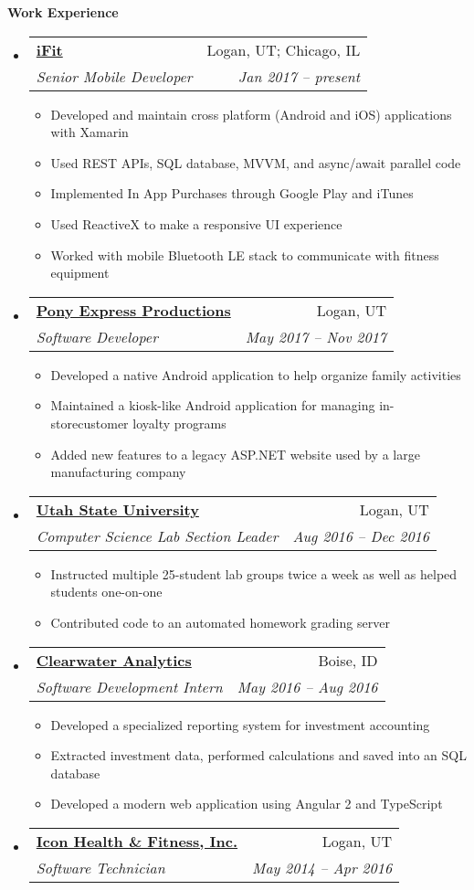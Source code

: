 \documentclass[letterpaper,11pt]{article}
\makeatletter
\newcommand{\resitem}[1]{\item #1 \vspace{-2pt}}
\newcommand{\resheading}[1]{{\large \colorbox{mygrey}{\begin{minipage}{\textwidth}{\textbf{#1 \vphantom{p\^{E}}}}\end{minipage}}}}
\newcommand{\ressubheading}[4]{
\begin{tabular*}{6.5in}{l@{\extracolsep{\fill}}r}
		\textbf{#1} & #2 \\
		\textit{#3} & \textit{#4} \\
\end{tabular*}\vspace{-6pt}}
\makeatother
\begin{document}
\resheading{Work Experience}
	\begin{itemize}
		\item 
		\ressubheading{\href{http://www.ifit.com}{iFit}}{Logan, UT; Chicago, IL}{Senior Mobile Developer}{Jan 2017 -- present}
		{ \footnotesize
			\begin{itemize}
				\resitem{Developed and maintain cross platform (Android and iOS) applications with Xamarin}
				\resitem{Used REST APIs, SQL database, MVVM, and async/await parallel code}
				\resitem{Implemented In App Purchases through Google Play and iTunes}
				\resitem{Used ReactiveX to make a responsive UI experience}
				\resitem{Worked with mobile Bluetooth LE stack to communicate with fitness equipment}
			\end{itemize}
		}
		\item 
		\ressubheading{\href{http://www.pxp200.com}{Pony Express Productions}}{Logan, UT}{Software Developer}{May 2017 -- Nov 2017}
		{ \footnotesize
			\begin{itemize}
				\resitem{Developed a native Android application to help organize family activities}
				\resitem{Maintained a kiosk-like Android application for managing in-storecustomer loyalty programs}
				\resitem{Added new features to a legacy ASP.NET website used by a large manufacturing company}
			\end{itemize}
		}
		\item 
		\ressubheading{\href{http://www.cs.usu.edu}{Utah State University}}{Logan, UT}{Computer Science Lab Section Leader}{Aug 2016 -- Dec 2016}
		{ \footnotesize
			\begin{itemize}
				\resitem{Instructed multiple 25-student lab groups twice a week as well as helped students one-on-one}
				\resitem{Contributed code to an automated homework grading server}
			\end{itemize}
		}
		\item 
		\ressubheading{\href{http://www.clearwateranalytics.com}{Clearwater Analytics}}{Boise, ID}{Software Development Intern}{May 2016 -- Aug 2016}
		{ \footnotesize
			\begin{itemize}
				\resitem{Developed a specialized reporting system for investment accounting}
				\resitem{Extracted investment data, performed calculations and saved into an SQL database}
				\resitem{Developed a modern web application using Angular 2 and TypeScript}
			\end{itemize}
		}
		\item 
			\ressubheading{\href{http://www.iconhealthandfitness.com}{Icon Health \& Fitness, Inc.}}{Logan, UT}{Software Technician}{May 2014 -- Apr 2016}

\end{itemize}
\end{document}
